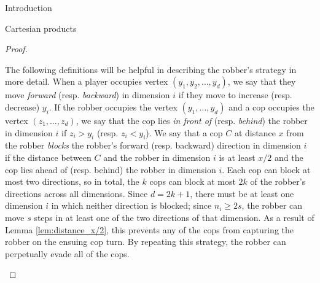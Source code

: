 \documentclass[12pt]{amsart}
\theoremstyle{definition}
\begin{document}
\begin{section}{Introduction}
\begin{section}{Cartesian products}
\begin{proof}
\begin{enumerate}[label={\textbf{(\alph*)}}]
    
    The following definitions will be helpful in describing the robber's strategy in more detail.  When a player occupies vertex $(y_1,y_2,\dots,y_d)$, we say that they move \textit{forward} (resp. \textit{backward}) in dimension $i$ if they move to increase (resp. decrease) $y_i$.  If the robber occupies the vertex $(y_1,\dots,y_d)$ and a cop occupies the vertex $(z_1,\dots,z_d)$, we say that the cop lies \textit{in front of} (resp. \textit{behind}) the robber in dimension $i$ if $z_i>y_i$ (resp. $z_i<y_i$).  We say that a cop $C$ at distance $x$ from the robber \textit{blocks} the robber's forward (resp. backward) direction in dimension $i$ if the distance between $C$ and the robber in dimension $i$ is at least $x/2$ and the cop lies ahead of (resp. behind) the robber in dimension $i$.  Each cop can block at most two directions, so in total, the $k$ cops can block at most $2k$ of the robber's directions across all dimensions.  Since $d = 2k+1$, there must be at least one dimension $i$ in which neither direction is blocked; since $n_i \ge 2s$, the robber can move $s$ steps in at least one of the two directions of that dimension.  As a result of Lemma \ref{lem:distance_x/2}, this prevents any of the cops from capturing the robber on the ensuing cop turn.  By repeating this strategy, the robber can perpetually evade all of the cops.
    \end{enumerate}
    

\end{proof}
\end{section}
\end{section}
\end{document}
